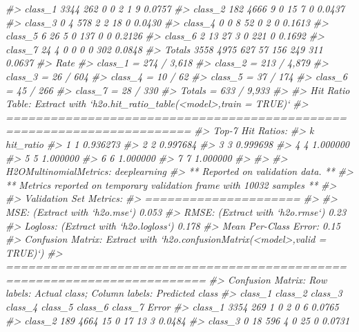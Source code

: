 \documentclass[]{book}
\newenvironment{Shaded}{\begin{snugshade}}{\end{snugshade}}
\newcommand{\CommentTok}[1]{\textcolor[rgb]{0.56,0.35,0.01}{\textit{#1}}}
\begin{document}
\begin{Shaded}
\begin{Highlighting}[]
{{{{\CommentTok{#> class_1    3344     262       0       0       2       1       9 0.0757}
\CommentTok{#> class_2     182    4666       9       0      15       7       0 0.0437}
\CommentTok{#> class_3       0       4     578       2       2      18       0 0.0430}
\CommentTok{#> class_4       0       0       8      52       0       2       0 0.1613}
\CommentTok{#> class_5       6      26       5       0     137       0       0 0.2126}
\CommentTok{#> class_6       2      13      27       3       0     221       0 0.1692}
\CommentTok{#> class_7      24       4       0       0       0       0     302 0.0848}
\CommentTok{#> Totals     3558    4975     627      57     156     249     311 0.0637}
\CommentTok{#>                  Rate}
\CommentTok{#> class_1 = 274 / 3,618}
\CommentTok{#> class_2 = 213 / 4,879}
\CommentTok{#> class_3 =    26 / 604}
\CommentTok{#> class_4 =     10 / 62}
\CommentTok{#> class_5 =    37 / 174}
\CommentTok{#> class_6 =    45 / 266}
\CommentTok{#> class_7 =    28 / 330}
\CommentTok{#> Totals  = 633 / 9,933}
\CommentTok{#> }
\CommentTok{#> Hit Ratio Table: Extract with `h2o.hit_ratio_table(<model>,train = TRUE)`}
\CommentTok{#> =======================================================================}
\CommentTok{#> Top-7 Hit Ratios: }
\CommentTok{#>   k hit_ratio}
\CommentTok{#> 1 1  0.936273}
\CommentTok{#> 2 2  0.997684}
\CommentTok{#> 3 3  0.999698}
\CommentTok{#> 4 4  1.000000}
\CommentTok{#> 5 5  1.000000}
\CommentTok{#> 6 6  1.000000}
\CommentTok{#> 7 7  1.000000}
\CommentTok{#> }
\CommentTok{#> }
\CommentTok{#> H2OMultinomialMetrics: deeplearning}
\CommentTok{#> ** Reported on validation data. **}
\CommentTok{#> ** Metrics reported on temporary validation frame with 10032 samples **}
\CommentTok{#> }
\CommentTok{#> Validation Set Metrics: }
\CommentTok{#> =====================}
\CommentTok{#> }
\CommentTok{#> MSE: (Extract with `h2o.mse`) 0.053}
\CommentTok{#> RMSE: (Extract with `h2o.rmse`) 0.23}
\CommentTok{#> Logloss: (Extract with `h2o.logloss`) 0.178}
\CommentTok{#> Mean Per-Class Error: 0.15}
\CommentTok{#> Confusion Matrix: Extract with `h2o.confusionMatrix(<model>,valid = TRUE)`)}
\CommentTok{#> =========================================================================}
\CommentTok{#> Confusion Matrix: Row labels: Actual class; Column labels: Predicted class}
\CommentTok{#>         class_1 class_2 class_3 class_4 class_5 class_6 class_7  Error}
\CommentTok{#> class_1    3354     269       1       0       2       0       6 0.0765}
\CommentTok{#> class_2     189    4664      15       0      17      13       3 0.0484}
\CommentTok{#> class_3       0      18     596       4       0      25       0 0.0731}
}}}}
\end{Highlighting}
\end{Shaded}
\end{document}
